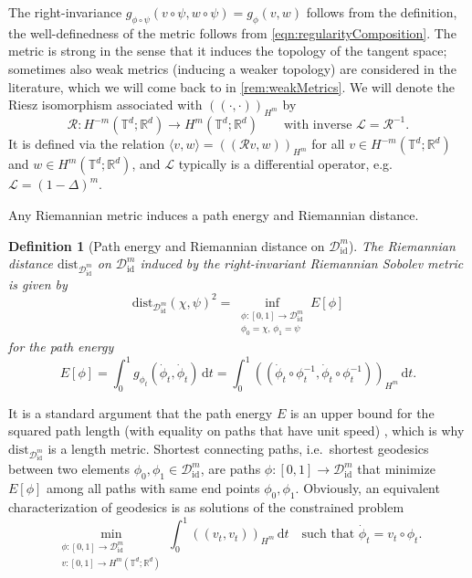 \documentclass[a4paper, 12pt]{article}
\newtheorem{definition}[theorem]{Definition}
\newcommand{\R}{\mathbb{R}}
\newcommand{\T}{\mathbb{T}}
\renewcommand{\d}{\mathrm{d}}
\newcommand{\id}{\mathrm{id}}
\newcommand{\DiffSobId}{\mathcal D_{\id}}
\newcommand{\dist}{\mathrm{dist}_{\DiffSobId^m}}
\newcommand{\Riesz}{\mathcal{R}}
\renewcommand{\L}{\mathcal{L}}
\newcommand{\IPHm}[2]{(\!(#1,#2)\!)_{H^m}} %
\begin{document}
The right-invariance $g_{\phi\circ\psi}(v\circ\psi,w\circ\psi)=g_\phi(v,w)$ follows from the definition, the well-definedness of the metric follows from \eqref{eqn:regularityComposition}.
The metric is strong in the sense that it induces the topology of the tangent space;
sometimes also weak metrics (inducing a weaker topology) are considered in the literature, which we will come back to in \cref{rem:weakMetrics}.
We will denote the Riesz isomorphism associated with $\IPHm{\cdot}{\cdot}$ by
\begin{equation*}
\Riesz:H^{-m}(\T^d;\R^d)\to H^m(\T^d;\R^d)
\qquad\text{with inverse }
\L=\Riesz^{-1}.
\end{equation*}
It is defined via the relation $\langle v,w\rangle=\IPHm{\Riesz v}{w}$ for all $v\in H^{-m}(\T^d;\R^d)$ and $w\in H^m(\T^d;\R^d)$,
and $\L$ typically is a differential operator, e.g.\ $\L=(1-\Delta)^m$.

Any Riemannian metric induces a path energy and Riemannian distance.

\begin{definition}[Path energy and Riemannian distance on $\DiffSobId^m$]
The \emph{Riemannian distance} $\dist$ on $\DiffSobId^m$ induced by the right-invariant Riemannian Sobolev metric is given by
\begin{equation*}
\dist(\chi,\psi)^2
=\inf_{\substack{\phi:[0,1]\to\DiffSobId^m\\\phi_0=\chi,\,\phi_1=\psi}}E[\phi]
\end{equation*}
for the \emph{path energy}
\begin{equation*}
E[\phi]=\int_0^1g_{\phi_t}(\dot\phi_t,\dot\phi_t)\,\d t=\int_0^1\IPHm{\dot\phi_t\circ\phi_t^{-1}}{\dot\phi_t\circ\phi_t^{-1}}\,\d t.
\end{equation*}
\end{definition}

It is a standard argument that the path energy $E$ is an upper bound for the squared path length (with equality on paths that have unit speed) \cite[Prop.\,1.8.7]{Kl95a},
which is why $\dist$ is a length metric.
Shortest connecting paths, i.e.\ shortest geodesics between two elements $\phi_0,\phi_1\in\DiffSobId^m$, are paths $\phi:[0,1]\to\DiffSobId^m$ that minimize $E[\phi]$
among all paths with same end points $\phi_0,\phi_1$.
Obviously, an equivalent characterization of geodesics is as solutions of the constrained problem
\begin{equation*}
\min_{\substack{\phi:[0,1]\to\DiffSobId^m\\v:[0,1]\to H^m(\T^d;\R^d)}}
\int_0^1\IPHm{v_t}{v_t}\,\d t
\quad\text{such that }\dot\phi_t=v_t\circ\phi_t.
\end{equation*}
\end{document}
